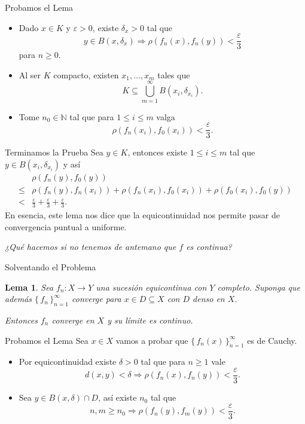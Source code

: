 \documentclass[utf8]{beamer}
\theoremstyle{plain}
\newtheorem{Lem}{Lema}                 %
\theoremstyle{definition}
\theoremstyle{remark}
\numberwithin{equation}{section}
\newcommand{\dl}{\delta}                %
\newcommand{\eps}{\varepsilon}          %
\newcommand{\bN}{\mathbb{N}}    %
\newcommand{\set}[1]{\{\,#1\,\}}    %
\renewcommand{\geq}{\geqslant}          %
\renewcommand{\leq}{\leqslant}          %
\newcommand{\To}{\Rightarrow}
\newcommand{\sucm}{_{m=1}^\infty} %
\newcommand{\sucn}{_{n=1}^\infty} %
\begin{document}
\begin{frame}{Probamos el Lema}
\begin{itemize}
  \item Dado $x\in K$ y $\eps>0$, existe $\dl_x>0$ tal que 
  $$y\in B(x,\dl_x)\To \rho(f_n(x),f_n(y))<\frac{\eps}{3}$$
  para $n\geq 0$.
  \item Al ser $K$ compacto, existen $x_1,\dots,x_m$ tales que 
  $$K\subseteq\bigcup\sucm B(x_i,\dl_{x_i}).$$
  \item Tome $n_0\in\bN$ tal que para $1\leq i\leq m$ valga
  $$\rho(f_n(x_i),f_0(x_i))<\frac{\eps}{3}.$$
\end{itemize}
\end{frame}

\begin{frame}{Terminamos la Prueba}
  Sea $y\in K$, entonces existe $1\leq i\leq m$ tal que $y\in B(x_i,\dl_{x_i})$ y así
  \begin{align*}
    &\rho(f_n(y),f_0(y))\\
    \leq &\rho(f_n(y),f_n(x_i))+\rho(f_n(x_i),f_0(x_i))+\rho(f_0(x_i),f_0(y))\\
    <&\frac{\eps}{3}+\frac{\eps}{3}+\frac{\eps}{3}.
  \end{align*}
En esencia, este lema nos dice que la equicontinuidad nos permite pasar de convergencia puntual a uniforme.\par 
\emph{¿Qué hacemos si no tenemos de antemano que $f$ es continua?}
\end{frame}

\begin{frame}{Solventando el Problema}
  \begin{Lem}\label{lem:casoNoContEquicont}
    Sea $f_n:X\to Y$ una sucesión equicontinua con $Y$ completo. Suponga que además $\set{f_n}\sucn$ converge para $x\in D\subseteq X$ con $D$ denso en $X$.\par 
    Entonces $f_n$ converge en $X$ y su límite es continuo.
  \end{Lem}
\end{frame}

\begin{frame}{Probamos el Lema}
Sea $x\in X$ vamos a probar que $\set{f_n(x)}\sucn$ es de Cauchy.
\begin{itemize}
  \item Por equicontinuidad existe $\dl>0$ tal que para $n\geq 1$ vale
  $$d(x,y)<\dl\To\rho(f_n(x),f_n(y))<\frac{\eps}{3}.$$
  \item Sea $y\in B(x,\dl)\cap D$, así existe $n_0$ tal que 
  $$n,m\geq n_0\To \rho(f_n(y),f_m(y))<\frac{\eps}{3}.$$
  
\end{itemize}  
\end{frame}
\end{document}
